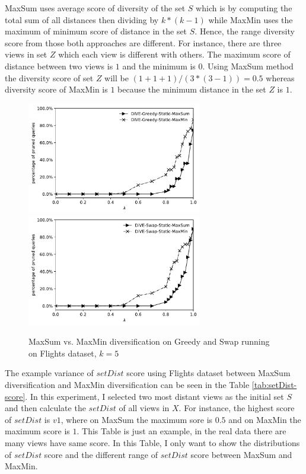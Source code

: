 \documentclass{article}
\begin{document}
MaxSum uses average score of diversity of the set $ S $ which is by computing the total sum of all distances then dividing by $ k*(k-1) $ while MaxMin uses the maximum of minimum score of distance in the set $ S $.  Hence, the range diversity score from those both approaches are different. For instance, there are three views in set $ Z $ which each view is different with others. The maximum score of distance between two views is $ 1 $ and the minimum is $ 0 $. Using MaxSum method the diversity score of set $ Z $ will be $ (1+1+1)/(3*(3-1)) = 0.5 $ whereas diversity score of MaxMin is $ 1 $ because the minimum distance in the set $ Z $ is $ 1 $. 


\begin{figure}
	\begin{center}
		\includegraphics[width=3.0in]{figures/MaxSum_MaxMin_Greedy}
		\includegraphics[width=3.0in]{figures/MaxSum_MaxMin_Swap}
		\caption{MaxSum vs. MaxMin diversification on Greedy and Swap running on Flights dataset, $k = 5$}
		\label{fig:maxsum-maxmin-greedy-swap}
	\end{center}
\end{figure}




The example variance of $ setDist $ score using Flights dataset between MaxSum diversification and MaxMin diversification can be seen in the Table \ref{tab:setDist-score}. In this experiment, I selected two most distant views as the initial set $ S $ and then calculate the $ setDist $ of all views in $ X $. For instance, the highest score of $ setDist $ is $ v1 $, where on MaxSum the maximum sore is $ 0.5 $ and on MaxMin the maximum score is $ 1 $. This Table is just an example, in the real data there are many views have same score. In this Table, I only want to show the distributions of $ setDist $ score and the different range of $ setDist $ score between MaxSum and MaxMin. 
\end{document}
